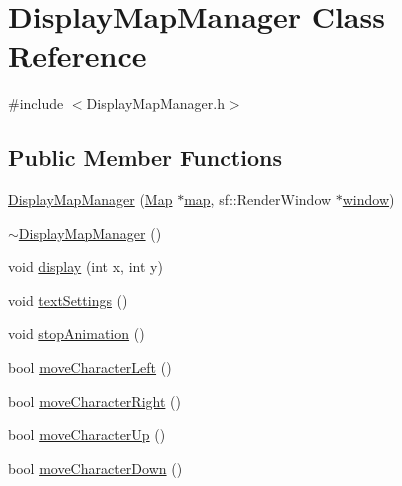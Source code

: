 \hypertarget{class_display_map_manager}{}\section{Display\+Map\+Manager Class Reference}
\label{class_display_map_manager}


{\ttfamily \#include $<$Display\+Map\+Manager.\+h$>$}

\subsection*{Public Member Functions}
\begin{DoxyCompactItemize}
\item 
\hyperlink{class_display_map_manager_acca16727ef15d478af88df1acb8a1c89}{Display\+Map\+Manager} (\hyperlink{class_map}{Map} $\ast$\hyperlink{class_display_map_manager_aefa663d75781e47edfc5629e3652ead8}{map}, sf\+::\+Render\+Window $\ast$\hyperlink{class_display_map_manager_a880f01a1287f35cc4852c2e5d58ecd24}{window})
\item 
\hyperlink{class_display_map_manager_a9bce4856c4b749ce83a477d1801d1599}{$\sim$\+Display\+Map\+Manager} ()
\item 
void \hyperlink{class_display_map_manager_abd434e3d2795be7f9421f8bfe694d934}{display} (int x, int y)
\item 
void \hyperlink{class_display_map_manager_aff8cc85b9a149514ae95608ddbe20e10}{text\+Settings} ()
\item 
void \hyperlink{class_display_map_manager_a9b8270c9ea4c4f5f036248719b4eae7c}{stop\+Animation} ()
\item 
bool \hyperlink{class_display_map_manager_af7e12870120f25befe945d54fe452288}{move\+Character\+Left} ()
\item 
bool \hyperlink{class_display_map_manager_ad17768ba9192593d2f0e6c8dad853899}{move\+Character\+Right} ()
\item 
bool \hyperlink{class_display_map_manager_ab1ed4f96b21f662039d3a96bafd75ca2}{move\+Character\+Up} ()
\item 
bool \hyperlink{class_display_map_manager_a9d19cecb4e669680321fef6d3e85910c}{move\+Character\+Down} ()
\end{DoxyCompactItemize}
